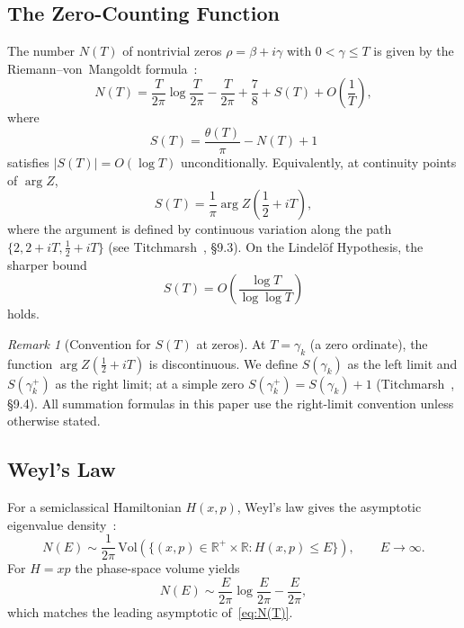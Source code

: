\documentclass{pre-aomart}
\def\zeta{Z}%
\theoremstyle{plain}
\theoremstyle{definition}
\theoremstyle{remark}
\newtheorem{remark}[theorem]{Remark}
\begin{document}
\subsection{The Zero-Counting Function}

The number $N(T)$ of nontrivial zeros $\rho = \beta + i\gamma$ with $0 < \gamma \leq T$ is
given by the Riemann--von~Mangoldt formula~\cite{Titchmarsh1986,Edwards1974}:
\begin{equation}\label{eq:N(T)}
N(T) = \frac{T}{2\pi}\log\frac{T}{2\pi} - \frac{T}{2\pi} + \frac{7}{8} + S(T) + O\!\left(\frac{1}{T}\right),
\end{equation}
where
\begin{equation}\label{eq:ST}
S(T) = \frac{\theta(T)}{\pi} - N(T) + 1
\end{equation}
satisfies $|S(T)| = O(\log T)$ unconditionally.
Equivalently, at continuity points of $\arg\zeta$,
\begin{equation}\label{eq:ST_alt}
S(T) = \frac{1}{\pi}\arg\zeta\!\left(\frac12 + iT\right),
\end{equation}
where the argument is defined by continuous variation along the path
$\{2, 2+iT, \frac12+iT\}$
(see Titchmarsh~\cite{Titchmarsh1986}, \S9.3).
On the Lindel\"of Hypothesis, the sharper bound
\[
S(T) = O\!\left(\frac{\log T}{\log\log T}\right)
\]
holds.

\begin{remark}[Convention for $S(T)$ at zeros]\label{rem:S_convention}
At $T = \gamma_k$ (a zero ordinate), the function
$\arg\zeta(\frac12 + iT)$ is discontinuous.  We define
$S(\gamma_k)$ as the left limit and $S(\gamma_k^+)$ as the right
limit; at a simple zero $S(\gamma_k^+) = S(\gamma_k) + 1$
(Titchmarsh~\cite{Titchmarsh1986}, \S9.4).  All summation formulas
in this paper use the right-limit convention unless otherwise stated.
\end{remark}

\subsection{Weyl's Law}

For a semiclassical Hamiltonian $H(x,p)$, Weyl's law gives the asymptotic eigenvalue
density~\cite{IwaniecKowalski2004}:
\begin{equation}\label{eq:weyl}
N(E) \sim \frac{1}{2\pi}\,\mathrm{Vol}\!\left(\{(x,p) \in \mathbb{R}^+ \times \mathbb{R}
       : H(x,p) \leq E\}\right), \qquad E \to \infty.
\end{equation}
For $H = xp$ the phase-space volume yields
\begin{equation}\label{eq:weyl_xp}
N(E) \sim \frac{E}{2\pi}\log\frac{E}{2\pi} - \frac{E}{2\pi},
\end{equation}
which matches the leading asymptotic of~\eqref{eq:N(T)}.
\end{document}
